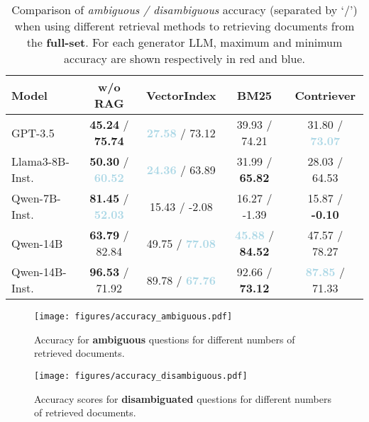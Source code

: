 \documentclass[11pt,a4paper]{article}
\begin{document}
\begin{table*}[t]
\small
\centering
\begin{tabular}{l|cccc}
\toprule
\textbf{Model} & \textbf{w/o RAG} & \textbf{VectorIndex} & \textbf{BM25} & \textbf{Contriever} \\
\midrule
GPT-3.5  & 
  \textbf{\textcolor{lightred}{45.24}} / \textbf{\textcolor{lightred}{75.74}} & 
  \textbf{\textcolor{lightblue}{27.58}} / 73.12 & 
  39.93 / 74.21 & 
  31.80 / \textbf{\textcolor{lightblue}{73.07}} \\
Llama3-8B-Inst. & 
  \textbf{\textcolor{lightred}{50.30}} / \textbf{\textcolor{lightblue}{60.52}} & 
  \textbf{\textcolor{lightblue}{24.36}} / 63.89 & 
  31.99 / \textbf{\textcolor{lightred}{65.82}} & 
  28.03 / 64.53 \\
Qwen-7B-Inst. & 
  \textbf{\textcolor{lightred}{81.45}} / \textbf{\textcolor{lightblue}{52.03}} & 
  15.43 / -2.08 & 
  16.27 / -1.39 & 
  15.87 / \textbf{\textcolor{lightred}{-0.10}} \\
Qwen-14B  & 
  \textbf{\textcolor{lightred}{63.79}} / 82.84 & 
  49.75 / \textbf{\textcolor{lightblue}{77.08}} & 
  \textbf{\textcolor{lightblue}{45.88}} / \textbf{\textcolor{lightred}{84.52}} & 
  47.57 / 78.27 \\
Qwen-14B-Inst. & 
  \textbf{\textcolor{lightred}{96.53}} / 71.92 & 
  89.78 / \textbf{\textcolor{lightblue}{67.76}} & 
  92.66 / \textbf{\textcolor{lightred}{73.12}} & 
  \textbf{\textcolor{lightblue}{87.85}} / 71.33 \\
\bottomrule
\end{tabular}
\caption{Comparison of  \textit{ambiguous / disambiguous} accuracy (separated by ‘/’)  when using different retrieval methods to retrieving documents from the \textbf{full-set}. For each generator LLM, maximum and minimum accuracy are shown respectively in red and blue.}
\label{tbl:retrievers:full-set:accuracy}
\end{table*}


\begin{figure*}[t]
  \centering
  \texttt{[image: figures/accuracy\_ambiguous.pdf]}
  \caption{Accuracy for \textbf{ambiguous} questions for different numbers of retrieved documents.}
  \label{fig:ambig_nums_retrieved:accuracy}
\end{figure*}
\begin{figure*}[t]
  \centering
  \texttt{[image: figures/accuracy\_disambiguous.pdf]}
  \caption{Accuracy scores for \textbf{disambiguated} questions for different numbers of retrieved documents.}
  \label{fig:disambig_nums_retrieved:accuracy}
\end{figure*}
\end{document}

